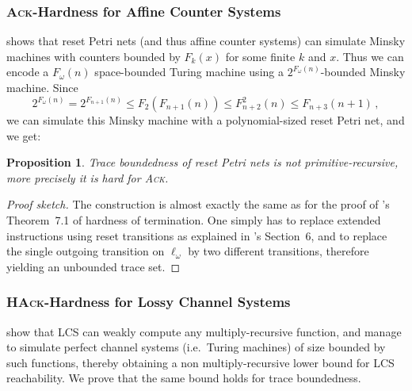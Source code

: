 \documentclass[11pt,reqno,a4paper]{amsart}
\theoremstyle{plain}
\newtheorem{proposition}[theorem]{Proposition}
\theoremstyle{definition}
\theoremstyle{remark}
\begin{document}
\subsubsection{\textsc{Ack}-Hardness for Affine Counter Systems}\label{sub:rst}
 shows that reset Petri nets (and thus affine counter
systems) can simulate Minsky
machines with counters bounded by
$F_k(x)$
for some finite $k$ and $x$.  Thus we can encode a
$F_\omega(n)$ space-bounded Turing machine using a $2^{F_\omega(n)}$-bounded
Minsky machine.  Since
\begin{equation*}
2^{F_\omega(n)}=2^{F_{n+1}(n)} \leq
F_2\!\left(F_{n+1}(n)\right)\leq F^2_{n+2}\!\left(n\right)\leq F_{n+3}\!\left(n+1\right)\,,
\end{equation*}
we can simulate this Minsky machine with a polynomial-sized reset
Petri net, and we get:
\begin{proposition}\label{prop:npr-acs}
  Trace boundedness of reset Petri nets is not primitive-recursive,
  more precisely it is hard for \textsc{Ack}.
\end{proposition}
\begin{proof}[Proof sketch]
  The construction is almost exactly the same as for the proof of
  \citet{acklcs}'s Theorem~7.1 of hardness of termination.  One simply
  has to replace extended instructions using reset transitions as
  explained in \citet{acklcs}'s Section~6, and to replace the single
  outgoing transition on $\ell_\omega$ by two different transitions,
  therefore yielding an unbounded trace set.
\end{proof}

\subsubsection{\textsc{HAck}-Hardness for Lossy Channel Systems}\label{sub:lcs}
 show that LCS can weakly compute any
multiply-recursive function, and manage to simulate perfect
channel systems (i.e.\ Turing machines) of size bounded by such
functions, thereby obtaining a non multiply-recursive lower bound for
LCS reachability.  We prove that the same bound holds for
trace boundedness.

\newcommand{\egdef}{\stackrel{\mbox{\begin{scriptsize}def\end{scriptsize}}}{=}}
\newcommand{\obracew}[2]{{\overset{#2}{\overbrace{#1}}}}
\newcommand{\Lim}{{\mathit{Lim}}}
\newcommand{\FF}{{\mathfrak{F}}}
\newcommand{\Nat}{{\mathbb{N}}} 
\end{document}
